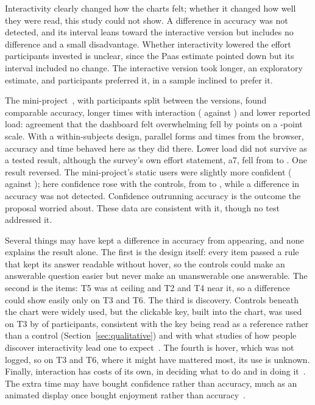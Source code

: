 \documentclass[10pt,twocolumn]{article}
\begin{document}
Interactivity clearly changed how the charts felt; whether it changed how well they were read, this study could not show. A difference in accuracy was not detected, and its interval leans toward the interactive version but includes no difference and a small disadvantage. Whether interactivity lowered the effort participants invested is unclear, since the Paas estimate pointed down but its interval included no change. The interactive version took longer, an exploratory estimate, and participants preferred it, in a sample inclined to prefer it.

The mini-project~\cite{rebollar2026mini}, with  participants split between the versions, found comparable accuracy, longer times with interaction ( against ) and lower reported load: agreement that the dashboard felt overwhelming fell by  points on a -point scale. With a within-subjects design, parallel forms and times from the browser, accuracy and time behaved here as they did there. Lower load did not survive as a tested result, although the survey's own effort statement, a7, fell from  to . One result reversed. The mini-project's static users were slightly more confident ( against ); here confidence rose with the controls, from  to , while a difference in accuracy was not detected. Confidence outrunning accuracy is the outcome the proposal worried about. These data are consistent with it, though no test addressed it.

Several things may have kept a difference in accuracy from appearing, and none explains the result alone. The first is the design itself: every item passed a rule that kept its answer readable without hover, so the controls could make an answerable question easier but never make an unanswerable one answerable. The second is the items: T5 was at ceiling and T2 and T4 near it, so a difference could show easily only on T3 and T6. The third is discovery. Controls beneath the chart were widely used, but the clickable key, built into the chart, was used on T3 by  of  participants, consistent with the key being read as a reference rather than a control (Section~\ref{sec:qualitative}) and with what studies of how people discover interactivity lead one to expect~\cite{blascheck2019}. The fourth is hover, which was not logged, so on T3 and T6, where it might have mattered most, its use is unknown. Finally, interaction has costs of its own, in deciding what to do and in doing it~\cite{lam2008}. The extra time may have bought confidence rather than accuracy, much as an animated display once bought enjoyment rather than accuracy~\cite{robertson2008}.
\end{document}
